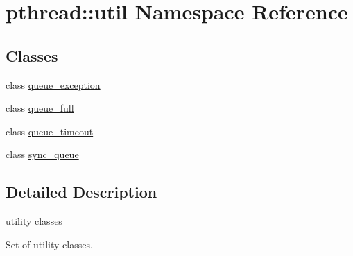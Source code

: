 \hypertarget{namespacepthread_1_1util}{\section{pthread\+:\+:util Namespace Reference}
\label{namespacepthread_1_1util}
}
\subsection*{Classes}
\begin{DoxyCompactItemize}
\item 
class \hyperlink{classpthread_1_1util_1_1queue__exception}{queue\+\_\+exception}
\item 
class \hyperlink{classpthread_1_1util_1_1queue__full}{queue\+\_\+full}
\item 
class \hyperlink{classpthread_1_1util_1_1queue__timeout}{queue\+\_\+timeout}
\item 
class \hyperlink{classpthread_1_1util_1_1sync__queue}{sync\+\_\+queue}
\end{DoxyCompactItemize}


\subsection{Detailed Description}
utility classes

Set of utility classes. 